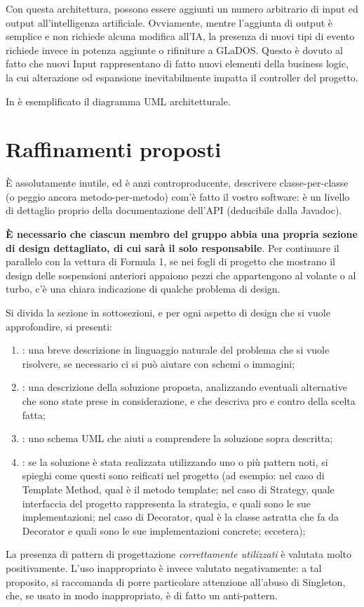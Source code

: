 \documentclass[a4paper,12pt]{report}
\begin{document}
Con questa architettura, possono essere aggiunti un numero arbitrario di input ed output
all'intelligenza artificiale.
%
Ovviamente, mentre l'aggiunta di output è semplice e non richiede alcuna modifica all'IA, la
presenza di nuovi tipi di evento richiede invece in potenza aggiunte o rifiniture a GLaDOS.
%
Questo è dovuto al fatto che nuovi Input rappresentano di fatto nuovi elementi della business
logic, la cui alterazione od espansione inevitabilmente impatta il controller del progetto.

In  è esemplificato il diagramma UML architetturale.


\section{Raffinamenti proposti}

È assolutamente inutile, ed è anzi controproducente, descrivere classe-per-classe (o peggio ancora metodo-per-metodo) com'è fatto il vostro software: è un livello di dettaglio proprio della documentazione dell'API (deducibile dalla Javadoc).

\textbf{È necessario che ciascun membro del gruppo abbia una propria sezione di design dettagliato,
di cui sarà il solo responsabile}.
Per continuare il parallelo con la vettura di Formula 1, se nei fogli di progetto che mostrano il
design delle sospensioni anteriori appaiono pezzi che appartengono al volante o al turbo, c'è una
chiara indicazione di qualche problema di design.

Si divida la sezione in sottosezioni, e per ogni aspetto di design che si vuole approfondire, si presenti:
\begin{enumerate}
    \item: una breve descrizione in linguaggio naturale del problema che si vuole risolvere, se necessario ci si può aiutare con schemi o immagini;
    \item: una descrizione della soluzione proposta, analizzando eventuali alternative che sono state prese in considerazione, e che descriva pro e contro della scelta fatta;
    \item: uno schema UML che aiuti a comprendere la soluzione sopra descritta;
    \item: se la soluzione è stata realizzata utilizzando uno o più pattern noti, si spieghi come questi sono reificati nel progetto
    (ad esempio: nel caso di Template Method, qual è il metodo template;
    nel caso di Strategy, quale interfaccia del progetto rappresenta la strategia, e quali sono le sue implementazioni;
    nel caso di Decorator, qual è la classe astratta che fa da Decorator e quali sono le sue implementazioni concrete; eccetera);
\end{enumerate}
%
La presenza di pattern di progettazione \emph{correttamente utilizzati} è valutata molto positivamente.
%
L'uso inappropriato è invece valutato negativamente: a tal proposito, si raccomanda di porre particolare attenzione all'abuso di Singleton, che, se usato in modo inappropriato, è di fatto un anti-pattern.
\end{document}
